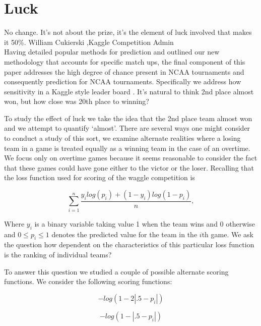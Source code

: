 
\section{Luck}

No change. It's not about the prize, it's the element of luck involved that makes it 50\%. William Cukierski ,Kaggle Competition Admin \\

Having detailed popular methods for prediction and outlined our new methodology that accounts for specific match ups, the final component of this paper addresses the high degree of chance present in NCAA tournaments and consequently prediction for NCAA tournaments.  Specifically we address how sensitivity in a Kaggle style leader board . It's natural to think 2nd place almost won, but how close was 20th place to winning? 


To study the effect of luck we take the idea that the 2nd place team almost won and we attempt to quantify `almost'. There are several ways one might consider to conduct a study of this sort, we examine alternate realities where a losing team in a game is treated equally as a winning team in the case of an overtime. We focus only on overtime games because it seems reasonable to consider the fact that these games could have gone either to the victor or the loser. Recalling that the loss function used for scoring of the waggle competition is

\begin{equation}
\sum_{i=1}^n\frac{y_ilog(p_i)+ (1-y_i)log(1-p_i)}{n},
\end{equation}

Where $y_i$ is a binary variable taking value 1 when the team wins and 0 otherwise and $0 \leq p_i \leq 1$ denotes the predicted value for the team in the $i$th game.  
We ask the question how dependent on the characteristics of this particular loss function is the ranking of individual teams? 

To answer this question we studied a couple of possible alternate scoring functions. We consider the following scoring functions: 
 

\begin{equation}
-log(1-2|.5-p_i|)
\end{equation} 

\begin{equation}
-log(1-|.5-p_i|)
\end{equation} 

